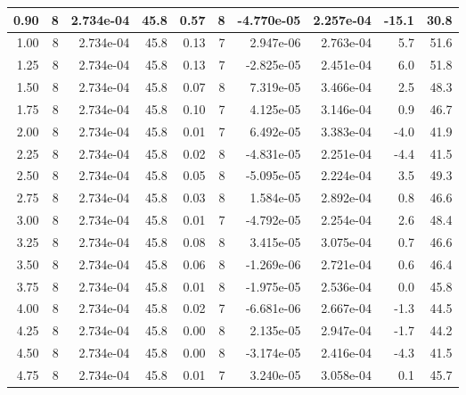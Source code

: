 \begin{tabular}{rrrrrrrrrr}
0.90 &  8 &  2.734e-04 &  45.8 &  0.57 &  8 &  -4.770e-05 &  2.257e-04 &  -15.1 &  30.8\\ 
\hline
 1.00 &  8 &  2.734e-04 &  45.8 &  0.13 &  7 &  2.947e-06 &  2.763e-04 &  5.7 &  51.6\\ 
1.25 &  8 &  2.734e-04 &  45.8 &  0.13 &  7 &  -2.825e-05 &  2.451e-04 &  6.0 &  51.8\\ 
1.50 &  8 &  2.734e-04 &  45.8 &  0.07 &  8 &  7.319e-05 &  3.466e-04 &  2.5 &  48.3\\ 
1.75 &  8 &  2.734e-04 &  45.8 &  0.10 &  7 &  4.125e-05 &  3.146e-04 &  0.9 &  46.7\\ 
2.00 &  8 &  2.734e-04 &  45.8 &  0.01 &  7 &  6.492e-05 &  3.383e-04 &  -4.0 &  41.9\\ 
2.25 &  8 &  2.734e-04 &  45.8 &  0.02 &  8 &  -4.831e-05 &  2.251e-04 &  -4.4 &  41.5\\ 
2.50 &  8 &  2.734e-04 &  45.8 &  0.05 &  8 &  -5.095e-05 &  2.224e-04 &  3.5 &  49.3\\ 
2.75 &  8 &  2.734e-04 &  45.8 &  0.03 &  8 &  1.584e-05 &  2.892e-04 &  0.8 &  46.6\\ 
3.00 &  8 &  2.734e-04 &  45.8 &  0.01 &  7 &  -4.792e-05 &  2.254e-04 &  2.6 &  48.4\\ 
3.25 &  8 &  2.734e-04 &  45.8 &  0.08 &  8 &  3.415e-05 &  3.075e-04 &  0.7 &  46.6\\ 
3.50 &  8 &  2.734e-04 &  45.8 &  0.06 &  8 &  -1.269e-06 &  2.721e-04 &  0.6 &  46.4\\ 
3.75 &  8 &  2.734e-04 &  45.8 &  0.01 &  8 &  -1.975e-05 &  2.536e-04 &  0.0 &  45.8\\ 
4.00 &  8 &  2.734e-04 &  45.8 &  0.02 &  7 &  -6.681e-06 &  2.667e-04 &  -1.3 &  44.5\\ 
4.25 &  8 &  2.734e-04 &  45.8 &  0.00 &  8 &  2.135e-05 &  2.947e-04 &  -1.7 &  44.2\\ 
4.50 &  8 &  2.734e-04 &  45.8 &  0.00 &  8 &  -3.174e-05 &  2.416e-04 &  -4.3 &  41.5\\ 
4.75 &  8 &  2.734e-04 &  45.8 &  0.01 &  7 &  3.240e-05 &  3.058e-04 &  0.1 &  45.7\\ 
\hline
 \end{tabular}

